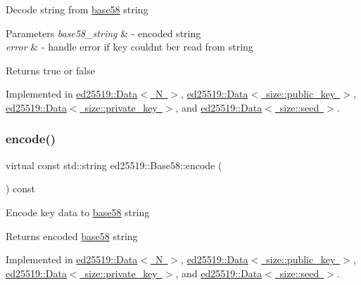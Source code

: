 Decode string from \mbox{\hyperlink{namespaceed25519_1_1base58}{base58}} string


\begin{DoxyParams}{Parameters}
{\em base58\+\_\+string} & -\/ encoded string \\
\hline
{\em error} & -\/ handle error if key couldn\textquotesingle{}t ber read from string \\
\hline
\end{DoxyParams}
\begin{DoxyReturn}{Returns}
true or false 
\end{DoxyReturn}


Implemented in \mbox{\hyperlink{classed25519_1_1_data_a281d932d3c3fe7fd40ce86ea7eff559b}{ed25519\+::\+Data$<$ N $>$}}, \mbox{\hyperlink{classed25519_1_1_data_a281d932d3c3fe7fd40ce86ea7eff559b}{ed25519\+::\+Data$<$ size\+::public\+\_\+key $>$}}, \mbox{\hyperlink{classed25519_1_1_data_a281d932d3c3fe7fd40ce86ea7eff559b}{ed25519\+::\+Data$<$ size\+::private\+\_\+key $>$}}, and \mbox{\hyperlink{classed25519_1_1_data_a281d932d3c3fe7fd40ce86ea7eff559b}{ed25519\+::\+Data$<$ size\+::seed $>$}}.

\mbox{\label{classed25519_1_1_base58_a1b52a018a5215e2dcf2aa388b0fe06bf}} 
\subsubsection{\texorpdfstring{encode()}{encode()}}
{\footnotesize\ttfamily virtual const std\+::string ed25519\+::\+Base58\+::encode (\begin{DoxyParamCaption}{ }\end{DoxyParamCaption}) const\hspace{0.3cm}{\ttfamily [pure virtual]}}

Encode key data to \mbox{\hyperlink{namespaceed25519_1_1base58}{base58}} string \begin{DoxyReturn}{Returns}
encoded \mbox{\hyperlink{namespaceed25519_1_1base58}{base58}} string 
\end{DoxyReturn}


Implemented in \mbox{\hyperlink{classed25519_1_1_data_a2dc2e23b950a10b168d7509a63ffca53}{ed25519\+::\+Data$<$ N $>$}}, \mbox{\hyperlink{classed25519_1_1_data_a2dc2e23b950a10b168d7509a63ffca53}{ed25519\+::\+Data$<$ size\+::public\+\_\+key $>$}}, \mbox{\hyperlink{classed25519_1_1_data_a2dc2e23b950a10b168d7509a63ffca53}{ed25519\+::\+Data$<$ size\+::private\+\_\+key $>$}}, and \mbox{\hyperlink{classed25519_1_1_data_a2dc2e23b950a10b168d7509a63ffca53}{ed25519\+::\+Data$<$ size\+::seed $>$}}.

